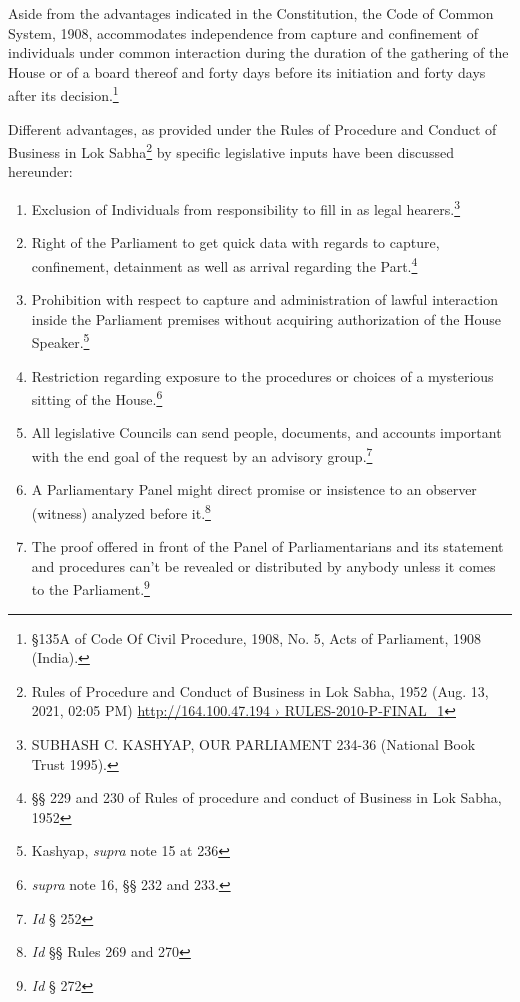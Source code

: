 \begin{multicols}{2}
\noi
Aside from the advantages indicated in the Constitution, the Code of Common System, 1908,
accommodates independence from capture and confinement of individuals under common
interaction during the duration of the gathering of the House or of a board thereof and forty
days before its initiation and forty days after its decision.\footnote{§135A of Code Of Civil Procedure, 1908, No. 5, Acts of Parliament, 1908 (India).}

\noi
Different advantages, as provided under the Rules of Procedure and Conduct of Business in
Lok Sabha\footnote{Rules of Procedure and Conduct of Business in Lok Sabha, 1952 (Aug. 13, 2021, 02:05 PM)  \url{http://164.100.47.194 › RULES-2010-P-FINAL_1}} by specific legislative inputs have been discussed hereunder:

\begin{enumerate}[label=$\bullet$]
\item Exclusion of Individuals from responsibility to fill in as legal hearers.\footnote{SUBHASH C. KASHYAP, OUR PARLIAMENT 234-36 (National Book Trust 1995).}

\item Right of the Parliament to get quick data with regards to capture, confinement,
detainment as well as arrival regarding the Part.\footnote{§§ 229 and 230 of Rules of procedure and conduct of Business in Lok Sabha, 1952}

\item Prohibition with respect to capture and administration of lawful interaction
inside the Parliament premises without acquiring authorization of the House
Speaker.\footnote{Kashyap, \textit{supra} note 15 at 236}

\item Restriction regarding exposure to the procedures or choices of a mysterious
sitting of the House.\footnote{\textit{supra} note 16, §§ 232 and 233.}

\item All legislative Councils can send people, documents, and accounts important
with the end goal of the request by an advisory group.\footnote{\textit{Id} § 252}

\item A Parliamentary Panel might direct promise or insistence to an observer
(witness) analyzed before it.\footnote{\textit{Id} §§ Rules 269 and 270}

\item The proof offered in front of the Panel of Parliamentarians and its statement
and procedures can't be revealed or distributed by anybody unless it comes to
the Parliament.\footnote{\textit{Id} § 272}


\end{enumerate}
\end{multicols}
